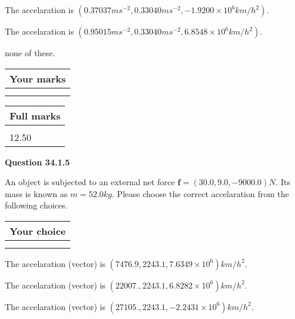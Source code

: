 \documentclass[12pt]{article}
\begin{document}
 
The accelaration is
$(
0.37037ms^{-2},
0.33040ms^{-2},
-1.9200 \times 10^{6}km/h^2
).
$
 
 
The accelaration is
$(
0.95015ms^{-2},
0.33040ms^{-2},
6.8548 \times 10^{6}km/h^2
).
$
 
 
none of these.
 
 
 
 

 
\vspace{0.3in}
  
\vspace{0.2in}
  
         \begin{tabular}{|l|}
\hline
 Your marks  \\
\hline
 \\ 
 \\ 
\hline
\end{tabular}
\hspace{0.05in} \begin{tabular}{|l|}
\hline
 Full marks  \\
\hline
 \\ 
12.50 \\
\hline
\end{tabular}
{\textbf{\Large{Question
34.1.5 
}}}
  
  
 
An object is subjected to an external net force $\mathbf{f}=(
30.0 ,
9.0,
-9000.0  )N$. Its mass is known as
$m= %
52.0  kg$. Please choose the correct accelaration
from the following choices.
 
  
  
\noindent\hspace{3.0in} \begin{tabular}{|l|}
\hline
Your choice \\
\hline
 \\ 
 \\ 
\hline
\end{tabular}
  
  
 
 
The accelaration (vector) is
$(
7476.9,
2243.1 ,
7.6349 \times 10^{6}
)km/h^2.
$
 
 
The accelaration (vector) is
$(
22007.,
2243.1 ,
6.8282 \times 10^{6}
)km/h^2.
$
 
 
The accelaration (vector) is
$(
27105.,
2243.1 ,
-2.2431 \times 10^{6}
)km/h^2.
$
 
\end{document}
